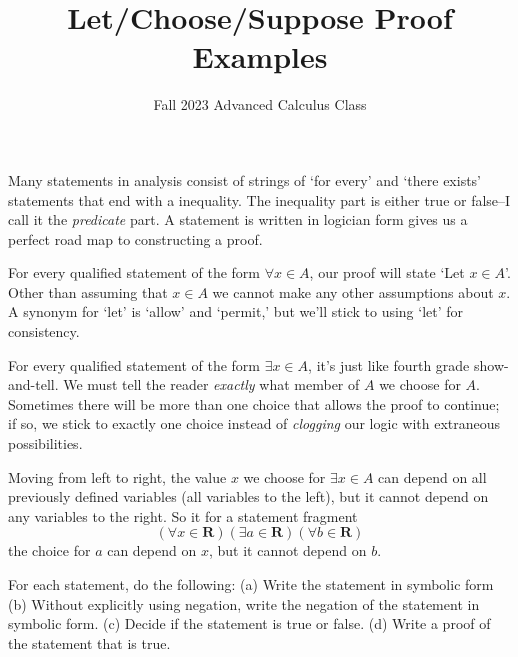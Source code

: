 \documentclass[12pt,fleqn,answers]{exam}
\title{Let/Choose/Suppose Proof Examples}
\author{Fall 2023 Advanced Calculus Class}
\newcommand{\reals}{\mathbf{R}}
\begin{document}
\maketitle

Many statements in analysis consist of strings of `for every' and `there exists' statements that end
with a inequality. The inequality part is either true or false--I call it the \emph{predicate} part. A
statement is written in logician form gives us a perfect road map to constructing a proof.

For every qualified statement of the form $\forall x \in A$, our proof will state `Let $x \in A$'. Other 
than assuming that $x \in A$ we cannot make any other assumptions about $x$. A synonym for `let' is
`allow' and `permit,'  but we'll stick to using `let' for consistency. 

For every qualified statement of the form $\exists x \in A$, it's just like fourth grade show-and-tell. We
must tell the reader \emph{exactly} what member of $A$ we choose for $A$.  Sometimes there will be
more than one choice that allows the proof to continue; if so, we stick to exactly one choice instead of 
\emph{clogging} our logic with extraneous possibilities.   

Moving from left to right, the value $x$ we choose for  $\exists x \in A$ can depend on all previously defined variables (all variables to the left), but it cannot depend on any variables to the right. So it for a  statement fragment
\begin{equation*}
    \left(\forall x \in \reals \right) \left(\exists a \in \reals\right) \left(\forall b \in \reals\right) 
\end{equation*}
the choice for $a$ can depend on $x$, but it cannot depend on $b$.


 \noindent For each statement, do the following:   (a) Write the statement in symbolic form
    (b) Without explicitly using negation, write the negation of 
    the statement in symbolic form.
    (c) Decide if the statement is true or false.
    (d) Write a proof of the statement that is true.
    
\end{document}
